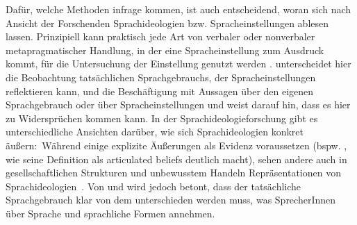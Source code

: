 Dafür, welche Methoden infrage kommen, ist auch entscheidend, woran sich nach Ansicht der Forschenden Sprachideologien bzw. Spracheinstellungen ablesen lassen. 
Prinzipiell kann praktisch jede Art von verbaler oder nonverbaler metapragmatischer Handlung, in der eine Sprach\-ein\-stel\-lung zum Ausdruck kommt, für die Untersuchung der Einstellung genutzt werden \citep[s.][242]{Ajzen1989}. 
\citet[1320--1321]{Vandermeeren2005} unterscheidet hier die Beobachtung tatsächlichen Sprachgebrauchs, der Sprach\-ein\-stel\-lungen reflektieren kann, und die Beschäftigung mit Aussagen über den eigenen Sprachgebrauch oder über Spracheinstellungen und weist darauf hin, dass es hier zu Widersprüchen kommen kann. 
In der Sprachideologieforschung gibt es unterschiedliche Ansichten darüber, wie sich Sprachideologien konkret äußern:~W{\"a}hrend einige explizite {\"A}u{\ss}erungen als Evidenz voraussetzen (bspw. \citealp{Silverstein1979}, wie seine Definition als \glqq articulated beliefs\grqq{} deutlich macht), sehen andere auch in gesellschaftlichen Strukturen und unbewusstem Handeln Repr{\"a}sentationen von Sprachideologien~\citep[s.][57--58]{Woolard1994}. 
Von \citet[52]{Irvine1998} und \citet[43]{Silverstein.1976} wird jedoch betont, dass der tatsächliche Sprachgebrauch klar von dem unterschieden werden muss, was SprecherInnen {\"u}ber Sprache und sprachliche Formen annehmen. 

